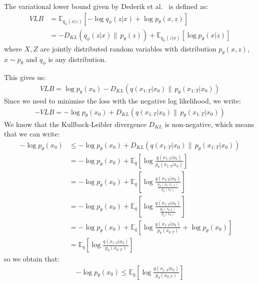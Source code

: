 \documentclass[twoside]{article}
\numberwithin{equation}{section}
\numberwithin{figure}{section}
\begin{document}
The variational lower bound given by Dederik et al.~\cite{kingma2022autoencoding} is defined as:
\begin{align}
  VLB &= \mathbb{E}_{q_\phi (x | z)} \left[ - \log q_\phi (z | x) + \log p_\theta(x, z) \right] \\[10pt]
  &= - D_{KL} (q_\phi (z | x) \| \, p_\theta (z)) + \mathbb{E}_{q_\phi (z | x)} \left[ \log p_\theta (x | z) \right]
\end{align}
where $X, Z$ are jointly distributed random variables with distribution $p_\theta (x, z)$, $x \sim p_\theta$ and $q_\phi$ is any distribution.

This gives us:
\begin{gather}
  VLB = \log p_{\theta}\left(x_0\right) - D_{KL}\left(q\left(x_{1:T}|x_0\right) \| \, p_{\theta}\left(x_{1:T}|x_0\right)\right)
\end{gather}
Since we need to minimise the loss with the negative log likelihood, we write:
\begin{gather}
  - VLB = - \log p_{\theta}\left(x_0\right) + D_{KL}\left(q\left(x_{1:T}|x_0\right) \| \, p_{\theta}\left(x_{1:T}|x_0\right)\right)
\end{gather}
We know that the Kullback-Leibler divergence $D_{KL}$ is non-negative, which means that we can write:
\begin{align}
  - \log p_{\theta}\left(x_0\right) &\leq - \log p_{\theta}\left(x_0\right) + D_{KL}\left(q\left(x_{1:T}|x_0\right) \| \, p_{\theta}\left(x_{1:T}|x_0\right)\right) \\[10pt]
  &= - \log p_{\theta}\left(x_0\right) + \mathbb{E}_q \left[\log \frac{q\left(x_{1:T}|x_0\right)}{p_{\theta}\left(x_{1:T}|x_0\right)}\right] \\[10pt]
  &= - \log p_{\theta}\left(x_0\right) + \mathbb{E}_q \left[\log \frac{q\left(x_{1:T}|x_0\right)}{\frac{p_{\theta}\left(x_0, x_{1:T}\right)}{p_{\theta}\left(x_0\right)}}\right] \\[10pt]
  &= - \log p_{\theta}\left(x_0\right) + \mathbb{E}_q \left[\log \frac{q\left(x_{1:T}|x_0\right)}{\frac{p_{\theta}\left(x_{0:T}\right)}{p_{\theta}\left(x_0\right)}}\right] \\[10pt]
  &= - \log p_{\theta}\left(x_0\right) + \mathbb{E}_q \left[\log \frac{q\left(x_{1:T}|x_0\right)}{p_{\theta}\left(x_{0:T}\right)} + \log {p_{\theta}\left(x_0\right)}\right] \\[10pt]
  &= \mathbb{E}_q \left[\log \frac{q\left(x_{1:T}|x_0\right)}{p_{\theta}\left(x_{0:T}\right)}\right]
\end{align}
so we obtain that:
\begin{align}
  - \log p_{\theta}\left(x_0\right) \leq \mathbb{E}_q \left[\log \frac{q\left(x_{1:T}|x_0\right)}{p_{\theta}\left(x_{0:T}\right)}\right]
\end{align}
\end{document}

